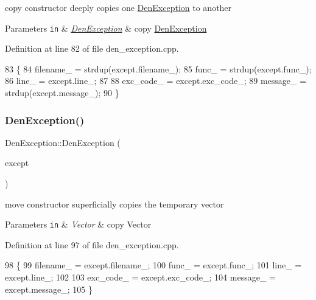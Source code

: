 copy constructor  deeply copies one \hyperlink{classDenException}{Den\+Exception} to another 


\begin{DoxyParams}[1]{Parameters}
\mbox{\tt in}  & {\em \hyperlink{classDenException}{Den\+Exception}} & copy \hyperlink{classDenException}{Den\+Exception} \\
\hline
\end{DoxyParams}


Definition at line 82 of file den\+\_\+exception.\+cpp.


\begin{DoxyCode}
83   \{
84     filename\_ = strdup(except.filename\_);
85     func\_     = strdup(except.func\_);
86     line\_     = except.line\_;
87 
88     exc\_code\_ = except.exc\_code\_;
89     message\_  = strdup(except.message\_);
90   \}
\end{DoxyCode}
\mbox{\label{classDenException_a6e21462a638a18d3af11e183bbb2e441}} 
\subsubsection{\texorpdfstring{Den\+Exception()}{DenException()}\hspace{0.1cm}{\footnotesize\ttfamily [3/3]}}
{\footnotesize\ttfamily Den\+Exception\+::\+Den\+Exception (\begin{DoxyParamCaption}\item[{\hyperlink{classDenException}{Den\+Exception} \&\&}]{except }\end{DoxyParamCaption})}



move constructor  superficially copies the temporary vector 


\begin{DoxyParams}[1]{Parameters}
\mbox{\tt in}  & {\em Vector} & copy Vector \\
\hline
\end{DoxyParams}


Definition at line 97 of file den\+\_\+exception.\+cpp.


\begin{DoxyCode}
98   \{
99     filename\_ = except.filename\_;
100     func\_     = except.func\_;
101     line\_     = except.line\_;
102 
103     exc\_code\_ = except.exc\_code\_;
104     message\_  = except.message\_;
105   \}
\end{DoxyCode}


